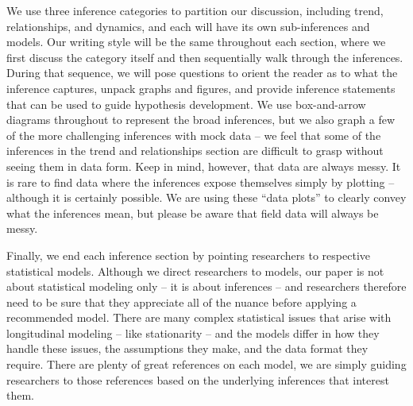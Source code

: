 \documentclass[english,,man]{apa6}
\theoremstyle{definition}
\theoremstyle{definition}
\theoremstyle{definition}
\theoremstyle{remark}
\begin{document}
We use three inference categories to partition our discussion, including
trend, relationships, and dynamics, and each will have its own
sub-inferences and models. Our writing style will be the same throughout
each section, where we first discuss the category itself and then
sequentially walk through the inferences. During that sequence, we will
pose questions to orient the reader as to what the inference captures,
unpack graphs and figures, and provide inference statements that can be
used to guide hypothesis development. We use box-and-arrow diagrams
throughout to represent the broad inferences, but we also graph a few of
the more challenging inferences with mock data -- we feel that some of
the inferences in the trend and relationships section are difficult to
grasp without seeing them in data form. Keep in mind, however, that data
are always messy. It is rare to find data where the inferences expose
themselves simply by plotting -- although it is certainly possible. We
are using these \enquote{data plots} to clearly convey what the
inferences mean, but please be aware that field data will always be
messy.

Finally, we end each inference section by pointing researchers to
respective statistical models. Although we direct researchers to models,
our paper is not about statistical modeling only -- it is about
inferences -- and researchers therefore need to be sure that they
appreciate all of the nuance before applying a recommended model. There
are many complex statistical issues that arise with longitudinal
modeling -- like stationarity -- and the models differ in how they
handle these issues, the assumptions they make, and the data format they
require. There are plenty of great references on each model, we are
simply guiding researchers to those references based on the underlying
inferences that interest them.
\end{document}
